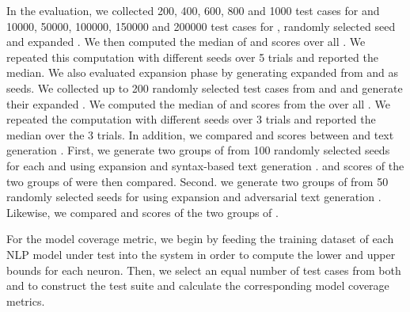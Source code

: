  In the evaluation, we collected 200, 400, 600, 800 and 1000 test cases for \sa and 10000, 50000, 100000, 150000 and 200000 test cases for \hsd, randomly selected \tool seed and expanded \sents. We then computed the median of \selfbleu and \pdr scores over all \lcs. We repeated this computation with different \tool seeds over 5 trials and reported the median. 
We also evaluated \tool expansion phase by generating expanded \sents from \Cklst and 
\hck as seeds. We collected up to 200 randomly selected test cases from \Cklst and 
\hck and generate their expanded \sents. We computed the median of \selfbleu and \pdr 
scores from the \sents over all \lcs. We repeated the computation with different \tool
seeds over 3 trials and reported the median over the 3 trials.
In addition, we compared \selfbleu and \pdr scores between \tool and text generation 
\bls. First, we generate two groups of \sents from 100 randomly selected \tool seeds 
for each \sa and \hsd using \tool expansion and syntax-based text generation \bl. 
\selfbleu and \pdr scores of the two groups of \sents were then compared. Second. we 
generate two groups of \sents from 50 randomly selected \tool seeds for \sa using 
\tool expansion and adversarial text generation \bls. Likewise, we compared \selfbleu 
and \pdr scores of the two groups of \sents.


For the model coverage metric, we begin by feeding the training dataset of each NLP model under test into the system in order to compute the lower and upper bounds for each neuron. Then, we select an equal number of test cases from both \tool and \Cklst to construct the test suite and calculate the corresponding model coverage metrics.








